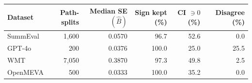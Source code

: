\begin{tabular}{lrrrrr}
\toprule
Dataset & Path-splits & Median SE$(\hat B)$ & Sign kept (\%) & CI $\ni 0$ (\%) & Disagree (\%) \\
\midrule
SummEval & 1,600 & 0.0570 & 96.7 & 52.6 & 0.0 \\
GPT-4o & 200 & 0.0376 & 100.0 & 25.0 & 25.5 \\
WMT & 7,050 & 0.3870 & 97.3 & 49.8 & 2.5 \\
OpenMEVA & 500 & 0.0333 & 100.0 & 35.2 & 0.0 \\
\bottomrule
\end{tabular}

